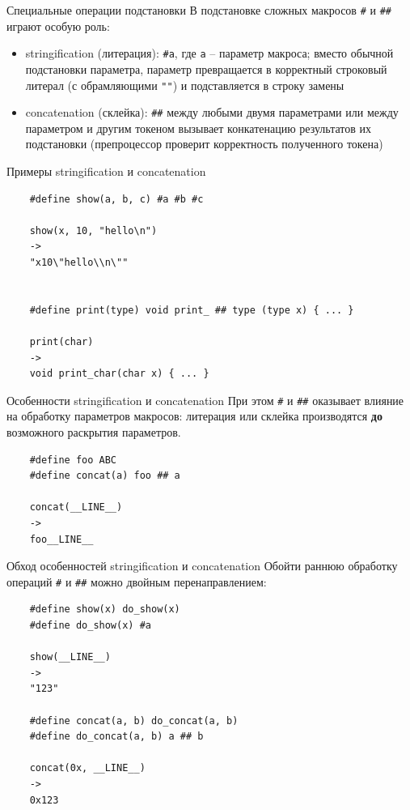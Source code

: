 \documentclass[unknownkeysallowed,xcolor=table]{beamer}
\begin{document}
\begin{frame}[fragile]{Специальные операции подстановки}
  В подстановке сложных макросов \lstinline{#} и \lstinline{##} играют особую роль:

  \vspace{2em}

  \begin{itemize}
    \item stringification (литерация): \lstinline{#a}, где \lstinline{a} -- параметр макроса; вместо обычной подстановки параметра, параметр превращается в корректный строковый литерал (с обрамляющими \lstinline{""}) и подставляется в строку замены \vspace{1em}
    \item concatenation (склейка): \lstinline{##} между любыми двумя параметрами или между параметром и другим токеном вызывает конкатенацию результатов их подстановки (препроцессор проверит корректность полученного токена)
  \end{itemize}
\end{frame}

\begin{frame}[fragile]{Примеры stringification и concatenation}
  \begin{lstlisting}
    #define show(a, b, c) #a #b #c

    show(x, 10, "hello\n")
    ->
    "x10\"hello\\n\""


    #define print(type) void print_ ## type (type x) { ... }

    print(char)
    ->
    void print_char(char x) { ... }
  \end{lstlisting}
\end{frame}

\begin{frame}[fragile]{Особенности stringification и concatenation}
  При этом \lstinline{#} и \lstinline{##} оказывает влияние на обработку параметров макросов: литерация или склейка производятся \textbf{до} возможного раскрытия параметров.

  \vspace{1em}

  \begin{lstlisting}
    #define foo ABC
    #define concat(a) foo ## a

    concat(__LINE__)
    ->
    foo__LINE__
  \end{lstlisting}
\end{frame}

\begin{frame}[fragile]{Обход особенностей stringification и concatenation}
  Обойти раннюю обработку операций \lstinline{#} и \lstinline{##} можно двойным перенаправлением:

  \begin{lstlisting}
    #define show(x) do_show(x)
    #define do_show(x) #a

    show(__LINE__)
    ->
    "123"

    #define concat(a, b) do_concat(a, b)
    #define do_concat(a, b) a ## b

    concat(0x, __LINE__)
    ->
    0x123
  \end{lstlisting}
\end{frame}
\end{document}
